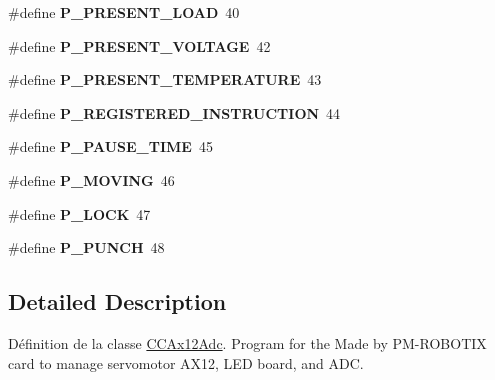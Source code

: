 \begin{DoxyCompactItemize}
\mbox{\label{Driver-EV3_2CCAx12Adc_8hpp_a7e52f36cffc7ef4a175a0af0e2e76ffe}} 
\#define {\bfseries P\+\_\+\+P\+R\+E\+S\+E\+N\+T\+\_\+\+L\+O\+AD}~40
\item 
\mbox{\label{Driver-EV3_2CCAx12Adc_8hpp_a43da4c4e7fa482dffa4b9dbd277d391b}} 
\#define {\bfseries P\+\_\+\+P\+R\+E\+S\+E\+N\+T\+\_\+\+V\+O\+L\+T\+A\+GE}~42
\item 
\mbox{\label{Driver-EV3_2CCAx12Adc_8hpp_ab029ba61a7bff3225e3914f77294c74e}} 
\#define {\bfseries P\+\_\+\+P\+R\+E\+S\+E\+N\+T\+\_\+\+T\+E\+M\+P\+E\+R\+A\+T\+U\+RE}~43
\item 
\mbox{\label{Driver-EV3_2CCAx12Adc_8hpp_a55d74e0a821481527c5fbd43a559585b}} 
\#define {\bfseries P\+\_\+\+R\+E\+G\+I\+S\+T\+E\+R\+E\+D\+\_\+\+I\+N\+S\+T\+R\+U\+C\+T\+I\+ON}~44
\item 
\mbox{\label{Driver-EV3_2CCAx12Adc_8hpp_ad9de5952e72d14d43c2a24acc83801ba}} 
\#define {\bfseries P\+\_\+\+P\+A\+U\+S\+E\+\_\+\+T\+I\+ME}~45
\item 
\mbox{\label{Driver-EV3_2CCAx12Adc_8hpp_af1f378b35a62ab2aab94ae90d4e940c6}} 
\#define {\bfseries P\+\_\+\+M\+O\+V\+I\+NG}~46
\item 
\mbox{\label{Driver-EV3_2CCAx12Adc_8hpp_a0f3d3d6df8c4b9c22d65b4dc360637f6}} 
\#define {\bfseries P\+\_\+\+L\+O\+CK}~47
\item 
\mbox{\label{Driver-EV3_2CCAx12Adc_8hpp_ae3a4723d4f1ae9e827ba87849f662260}} 
\#define {\bfseries P\+\_\+\+P\+U\+N\+CH}~48
\end{DoxyCompactItemize}


\subsection{Detailed Description}
Définition de la classe \hyperlink{classCCAx12Adc}{C\+C\+Ax12\+Adc}. Program for the Made by P\+M-\/\+R\+O\+B\+O\+T\+IX card to manage servomotor A\+X12, L\+ED board, and A\+DC. 

